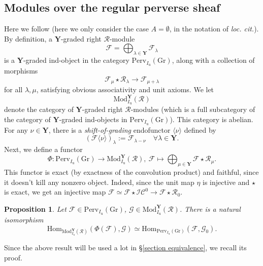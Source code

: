 \documentclass[11pt]{amsart}
\theoremstyle{plain}
\newtheorem{prop}[thm]{Proposition}
\theoremstyle{remark}
\numberwithin{equation}{section}
\begin{document}
	\subsection{Modules over the regular perverse sheaf}\label{section Modules over the regular perverse sheaf} Here we follow \cite[§5.4]{achar2022geometric} (here we only consider the case $A=\emptyset$, in the notation of \textit{loc. cit.}). By definition, a $\mathbf{Y}$-graded right $\mathcal{R}$-module
	$$\mathcal{F}=\bigoplus_{\lambda\in\mathbf{Y}}\mathcal{F}_\lambda$$
	is a $\mathbf{Y}$-graded ind-object in the category $\mathrm{Perv}_{I_\mathrm{u}}(\mathrm{Gr})$, along with a collection of morphisms
	$$\mathcal{F}_\mu\star\mathcal{R}_\lambda\to \mathcal{F}_{\mu+\lambda}$$
	for all $\lambda,\mu$, satisfying obvious associativity and unit axioms. We let 
	$$\mathrm{Mod}^\mathbf{Y}_{I_\mathrm{u}}(\mathcal{R}) $$
	denote the category of $\mathbf{Y}$-graded right $\mathcal{R}$-modules (which is a full subcategory of the category of $\mathbf{Y}$-graded ind-objects in $\mathrm{Perv}_{I_\mathrm{u}}(\mathrm{Gr})$). This category is abelian. For any $\nu\in\mathbf{Y}$, there is a \textit{shift-of-grading} endofunctor $\langle\nu\rangle$ defined by
	$$(\mathcal{F}\langle\nu\rangle)_\lambda:=\mathcal{F}_{\lambda-\nu} \quad \forall \lambda\in\mathbf{Y}.$$
	Next, we define a functor 
	$$\Phi:\mathrm{Perv}_{I_\mathrm{u}}(\mathrm{Gr})\to \mathrm{Mod}^\mathbf{Y}_{I_\mathrm{u}}(\mathcal{R}),~\mathcal{F}\mapsto\bigoplus_{\mu\in\mathbf{Y}}\mathcal{F}\star\mathcal{R}_\mu. $$
	This functor is exact (by exactness of the convolution product) and faithful, since it doesn't kill any nonzero object. Indeed, since the unit map $\eta$ is injective and $\star$ is exact, we get an injective map $\mathcal{F}\simeq \mathcal{F}\star\mathcal{IC}^0\to \mathcal{F}\star\mathcal{R}_0$. 
  \begin{prop}{{\cite[Lemma 5.1]{achar2022geometric}}}\label{prop iso morphisms}
     Let $\mathcal{F}\in \mathrm{Perv}_{I_\mathrm{u}}(\mathrm{Gr})$, $\mathcal{G}\in \mathrm{Mod}^\mathbf{Y}_{I_\mathrm{u}}(\mathcal{R})$. There is a natural isomorphism
     $$\mathrm{Hom}_{\mathrm{Mod}^\mathbf{Y}_{I_\mathrm{u}}(\mathcal{R})}(\Phi(\mathcal{F}),\mathcal{G})\simeq \mathrm{Hom}_{\mathrm{Perv}_{I_\mathrm{u}}(\mathrm{Gr})}(\mathcal{F},\mathcal{G}_0).$$
 \end{prop}Since the above result will be used a lot in §\ref{section equivalence}, we recall its proof.
\end{document}
